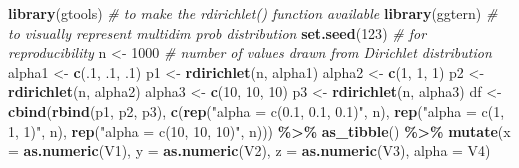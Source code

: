 \documentclass[
  12pt,
]{krantz}
\newenvironment{Shaded}{\begin{snugshade}}{\end{snugshade}}
\newcommand{\AttributeTok}[1]{\textcolor[rgb]{0.13,0.29,0.53}{#1}}
\newcommand{\CommentTok}[1]{\textcolor[rgb]{0.56,0.35,0.01}{\textit{#1}}}
\newcommand{\DecValTok}[1]{\textcolor[rgb]{0.00,0.00,0.81}{#1}}
\newcommand{\FunctionTok}[1]{\textcolor[rgb]{0.13,0.29,0.53}{\textbf{#1}}}
\newcommand{\NormalTok}[1]{#1}
\newcommand{\OtherTok}[1]{\textcolor[rgb]{0.56,0.35,0.01}{#1}}
\newcommand{\SpecialCharTok}[1]{\textcolor[rgb]{0.81,0.36,0.00}{\textbf{#1}}}
\newcommand{\StringTok}[1]{\textcolor[rgb]{0.31,0.60,0.02}{#1}}
\begin{document}
\begin{Shaded}
\begin{Highlighting}[]
\FunctionTok{library}\NormalTok{(gtools) }\CommentTok{\# to make the rdirichlet() function available}
\FunctionTok{library}\NormalTok{(ggtern) }\CommentTok{\# to visually represent multidim prob distribution }
\FunctionTok{set.seed}\NormalTok{(}\DecValTok{123}\NormalTok{) }\CommentTok{\# for reproducibility}
\NormalTok{n }\OtherTok{\textless{}{-}} \DecValTok{1000} \CommentTok{\# number of values drawn from Dirichlet distribution}
\NormalTok{alpha1 }\OtherTok{\textless{}{-}} \FunctionTok{c}\NormalTok{(.}\DecValTok{1}\NormalTok{, .}\DecValTok{1}\NormalTok{, .}\DecValTok{1}\NormalTok{)}
\NormalTok{p1 }\OtherTok{\textless{}{-}} \FunctionTok{rdirichlet}\NormalTok{(n, alpha1)}
\NormalTok{alpha2 }\OtherTok{\textless{}{-}} \FunctionTok{c}\NormalTok{(}\DecValTok{1}\NormalTok{, }\DecValTok{1}\NormalTok{, }\DecValTok{1}\NormalTok{)}
\NormalTok{p2 }\OtherTok{\textless{}{-}} \FunctionTok{rdirichlet}\NormalTok{(n, alpha2)}
\NormalTok{alpha3 }\OtherTok{\textless{}{-}} \FunctionTok{c}\NormalTok{(}\DecValTok{10}\NormalTok{, }\DecValTok{10}\NormalTok{, }\DecValTok{10}\NormalTok{)}
\NormalTok{p3 }\OtherTok{\textless{}{-}} \FunctionTok{rdirichlet}\NormalTok{(n, alpha3)}
\NormalTok{df }\OtherTok{\textless{}{-}} \FunctionTok{cbind}\NormalTok{(}\FunctionTok{rbind}\NormalTok{(p1, p2, p3), }\FunctionTok{c}\NormalTok{(}\FunctionTok{rep}\NormalTok{(}\StringTok{"alpha = c(0.1, 0.1, 0.1)"}\NormalTok{, n),}
                                     \FunctionTok{rep}\NormalTok{(}\StringTok{"alpha = c(1, 1, 1)"}\NormalTok{, n),}
                                     \FunctionTok{rep}\NormalTok{(}\StringTok{"alpha = c(10, 10, 10)"}\NormalTok{, n))) }\SpecialCharTok{\%\textgreater{}\%}
  \FunctionTok{as\_tibble}\NormalTok{() }\SpecialCharTok{\%\textgreater{}\%}
  \FunctionTok{mutate}\NormalTok{(}\AttributeTok{x =} \FunctionTok{as.numeric}\NormalTok{(V1),}
         \AttributeTok{y =} \FunctionTok{as.numeric}\NormalTok{(V2),}
         \AttributeTok{z =} \FunctionTok{as.numeric}\NormalTok{(V3),}
         \AttributeTok{alpha =}\NormalTok{ V4)}


\end{Highlighting}
\end{Shaded}
\end{document}
